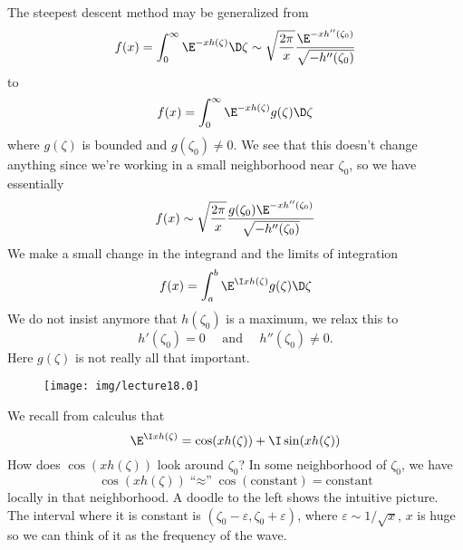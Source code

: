The steepest descent method may be generalized from
\begin{equation}
f(x)=\int^{\infty}_{0}\E^{-xh(\zeta)}\D\zeta\asymptote\sqrt{\frac{2\pi}{x}}\frac{\E^{-xh''(\zeta_{0})}}{\sqrt{-h''(\zeta_{0})}}
\end{equation}
to 
\begin{equation}
f(x)=\int^{\infty}_{0}\E^{-xh(\zeta)}g(\zeta)\D\zeta
\end{equation}
where $g(\zeta)$ is bounded and $g(\zeta_{0})\not=0$.
We see that this doesn't change anything since we're working in a
small neighborhood near $\zeta_{0}$, so we have essentially
\begin{equation}
f(x)\asymptote\sqrt{\frac{2\pi}{x}}\frac{g(\zeta_{0})\E^{-xh''(\zeta_{0})}}{\sqrt{-h''(\zeta_{0})}}
\end{equation}
We make a small change in the integrand and the limits of
integration
\begin{equation}
f(x)=\int^{b}_{a}\E^{\I xh(\zeta)}g(\zeta)\D\zeta
\end{equation}
We do not insist anymore that $h(\zeta_{0})$ is a maximum, we
relax this to 
\begin{equation}
h'(\zeta_{0})=0\quad\mbox{ and }\quad h''(\zeta_{0})\not=0.
\end{equation}
Here $g(\zeta)$ is not really all that important.

\begin{wrapfigure}{l}{1in}
\vspace{-20pt}
\begin{center}
\texttt{[image: img/lecture18.0]}
\end{center}
\end{wrapfigure}
\noindent{}We recall from calculus that
\begin{equation}
\E^{\I xh(\zeta)}=\cos(xh(\zeta))+\I\sin(xh(\zeta))
\end{equation}
How does $\cos(xh(\zeta))$ look around $\zeta_{0}$? In some
neighborhood of $\zeta_{0}$, we have
\begin{equation}
\cos(xh(\zeta))\mbox{``$\approx$''}\cos(\mbox{constant})=\mbox{constant}
\end{equation}
locally in that neighborhood. A doodle to the left shows the
intuitive picture. The interval where it is constant is
$(\zeta_{0}-\varepsilon,\zeta_{0}+\varepsilon)$, where
$\varepsilon\sim1/\sqrt{x}$, $x$ is huge so we can think of it as
the frequency of the wave.

